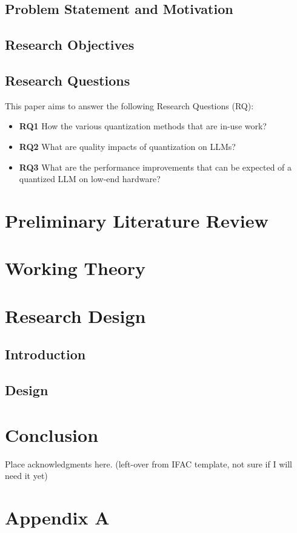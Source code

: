 \documentclass{ifacconf}
\begin{document}
	\subsection{Problem Statement and Motivation}
	
	\subsection{Research Objectives}
	\subsection{Research Questions}
	This paper aims to answer the following Research Questions (RQ):
	\begin{itemize}
		\item \textbf{RQ1} How the various quantization methods that are in-use work?
		\item \textbf{RQ2} What are quality impacts of quantization on LLMs?
		\item \textbf{RQ3} What are the performance improvements that can be expected of a quantized LLM on low-end hardware?
	\end{itemize}
	
	
	\section{Preliminary Literature Review}
	
	\section{Working Theory}
	
	\section{Research Design}
	\subsection{Introduction}
	\subsection{Design}
	
	\section{Conclusion}
	
	
	\begin{ack}
		Place acknowledgments here. (left-over from IFAC template, not sure if I will need it yet)
	\end{ack}
	
	
	
	\appendix
	\section{Appendix A}
\end{document}
